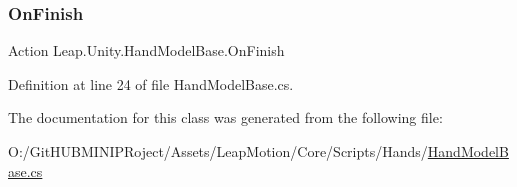 \subsubsection{\texorpdfstring{OnFinish}{OnFinish}}
{\footnotesize\ttfamily Action Leap.\+Unity.\+Hand\+Model\+Base.\+On\+Finish}



Definition at line 24 of file Hand\+Model\+Base.\+cs.



The documentation for this class was generated from the following file\+:\begin{DoxyCompactItemize}
\item 
O\+:/\+Git\+H\+U\+B\+M\+I\+N\+I\+P\+Roject/\+Assets/\+Leap\+Motion/\+Core/\+Scripts/\+Hands/\mbox{\hyperlink{_hand_model_base_8cs}{Hand\+Model\+Base.\+cs}}\end{DoxyCompactItemize}
